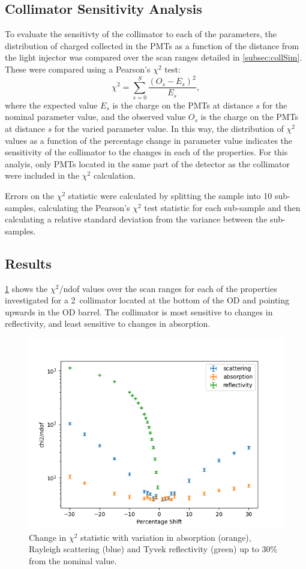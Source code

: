 \documentclass[a4paper,11pt]{article}
\begin{document}
\subsection{Collimator Sensitivity Analysis}\label{subsec:collAnalysis}

To evaluate the sensitivty of the collimator to each of the parameters, the distribution of charged collected in the PMTs as a function of the distance from the light injector was compared over the scan ranges detailed in \cref{subsec:collSim}. These were compared using a Pearson's $\chi^2$ test:
\begin{equation}
	\chi ^2 = \sum^S_{s=0}\frac{(O_s-E_s)^2}{E_s},
\end{equation}
where the expected value $E_s$ is the charge on the PMTs at distance $s$ for the nominal parameter value, and the observed value $O_s$ is the charge on the PMTs at distance $s$ for the  varied parameter value. In this way, the distribution of $\chi^2$ values as a function of the percentage change in parameter value indicates the sensitivity of the collimator to the changes in each of the properties. For this analyis, only PMTs located in the same part of the detector as the collimator were included in the $\chi^2$ calculation.

Errors on the $\chi^2$ statistic were calculated by splitting the sample into 10 sub-samples, calculating the Pearson’s $\chi^2$ test statistic for each sub-sample and then calculating a relative standard deviation from the variance between the sub-samples.


\subsection{Results}\label{subsec:collResults}

\cref{fig:barrelAllParams} shows the $\chi^2$/ndof values over the scan ranges for each of the properties investigated for a 2\textdegree~collimator located at the bottom of the OD and pointing upwards in the OD barrel. The collimator is most sensitive to changes in reflectivity, and least sensitive to changes in absorption.

\begin{figure}[ht!]
    \centering
    \includegraphics[width=0.5\linewidth]{params_plots_2.00.png}
    \caption{Change in $\chi^2$ statistic with variation in absorption (orange), Rayleigh scattering (blue) and Tyvek reflectivity (green) up to 30\% from the nominal value.}
    \label{fig:barrelAllParams}
\end{figure}
\end{document}
